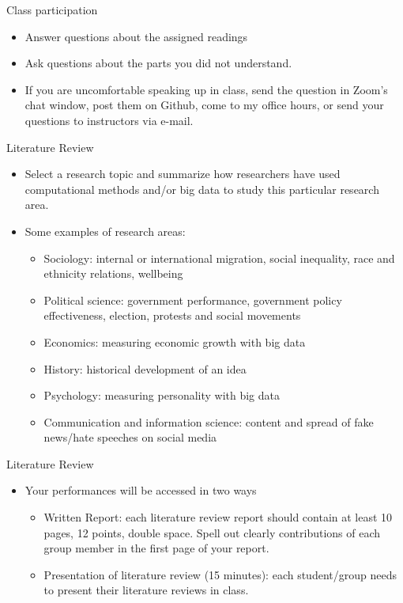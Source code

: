 \documentclass[handout]{beamer}
\begin{document}
\begin{frame}[label={h:e38686ef-1236-46dd-96ec-079dfb1147e1}]{Class participation}
\begin{itemize}
\item Answer questions about the assigned readings
\item Ask questions about the parts you did not understand.
\item If you are uncomfortable speaking up in class, send the question in Zoom's chat window, post them on Github, come to my office hours, or send your questions to instructors via e-mail.
\end{itemize}
\end{frame}

\begin{frame}[label={h:970b707a-4796-4e66-8155-f4e792472bc5}]{Literature Review}
\begin{itemize}
\item Select a research topic and summarize how researchers have used computational methods and/or big data to study this particular research area.
\item Some examples of research areas:
\begin{itemize}
\item Sociology:  internal or international migration, social inequality, race and ethnicity relations, wellbeing
\item Political science: government performance, government policy effectiveness, election, protests and social movements
\item Economics: measuring economic growth with big data
\item History: historical development of an idea
\item Psychology: measuring personality with big data
\item Communication and information science: content and spread of fake news/hate speeches on social media
\end{itemize}
\end{itemize}
\end{frame}
\begin{frame}[label={h:f4f3ccb5-ee16-4d34-8c42-7b56cb5fc8ff}]{Literature Review}
\begin{itemize}
\item Your performances will be accessed in two ways
\begin{itemize}
\item \alert{Written Report}: each literature review report should contain at least \alert{10 pages, 12 points, double space}. Spell out clearly contributions of each group member in the first page of your report.
\item \alert{Presentation of literature review} (\alert{15 minutes}): each student/group needs to present their literature reviews in class.
\end{itemize}
\end{itemize}
\end{frame}
\end{document}
